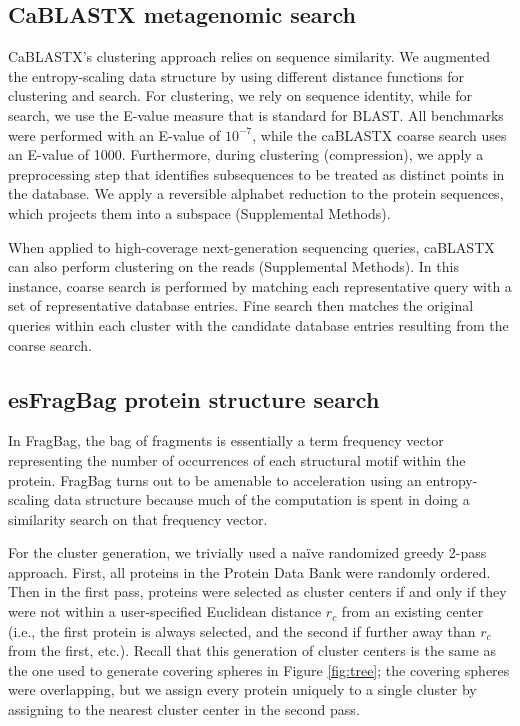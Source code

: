 \documentclass[review,preprint,12pt]{elsarticle}
\theoremstyle{definition}
\theoremstyle{remark}
\numberwithin{equation}{section}
\begin{document}
\subsection{CaBLASTX metagenomic search}
CaBLASTX's clustering approach relies on sequence similarity.
We augmented the entropy-scaling data structure by using
different distance functions for clustering and search.
For clustering, we rely on sequence identity, while for search, we use the
E-value measure that is standard for BLAST.
All benchmarks were performed with an E-value of $10^{-7}$, while the 
caBLASTX coarse search uses an E-value of 1000.
Furthermore, during clustering (compression), we apply a preprocessing step that
identifies subsequences to be treated as distinct points in the database.
We apply a reversible alphabet reduction to the
protein sequences, which projects them into a subspace (Supplemental Methods).

When applied to high-coverage next-generation sequencing queries, caBLASTX can also perform clustering on the reads (Supplemental Methods).
In this instance, coarse search is performed by matching each representative query with a set of representative database entries.
Fine search then matches the original queries within each cluster with the candidate database entries resulting from the coarse search.


\subsection{esFragBag protein structure search}
In FragBag, the bag of fragments is essentially
a term frequency vector representing the number of occurrences of each structural motif within the protein.
FragBag turns out to be amenable to acceleration using an entropy-scaling data structure because much of the computation is spent in doing a similarity search on that frequency vector.

For the cluster generation, we trivially used a na\"ive randomized greedy 2-pass approach.
First, all proteins in the Protein Data Bank were randomly ordered.
Then in the first pass, proteins were selected as cluster centers if and only if they were not within a user-specified Euclidean distance $r_c$ from an existing center (i.e., the first protein is always selected, and the second if further away than $r_c$ from the first, etc.).
Recall that this generation of cluster centers is the same as the one used to generate covering spheres in Figure \ref{fig:tree};
the covering spheres were overlapping, but we assign every protein uniquely to a single cluster by assigning to the nearest cluster center in the second pass.
\end{document}
